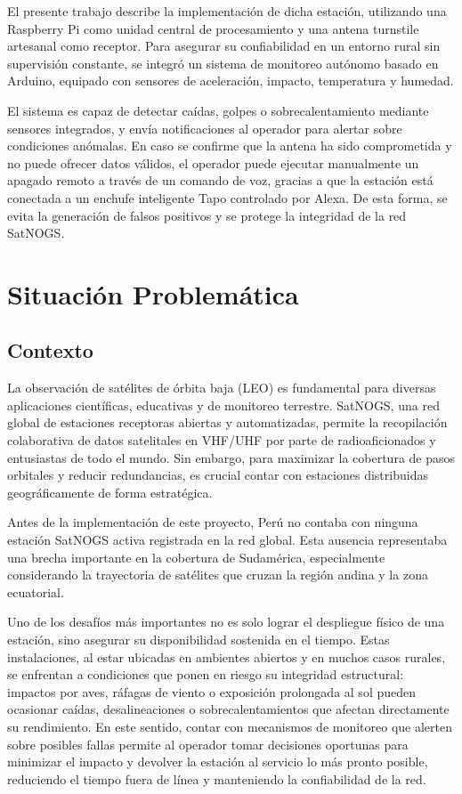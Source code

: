 \documentclass[conference]{IEEEtran}
\begin{document}
El presente trabajo describe la implementación de dicha estación, utilizando una Raspberry Pi como unidad central de procesamiento y una antena turnstile artesanal como receptor. Para asegurar su confiabilidad en un entorno rural sin supervisión constante, se integró un sistema de monitoreo autónomo basado en Arduino, equipado con sensores de aceleración, impacto, temperatura y humedad.

El sistema es capaz de detectar caídas, golpes o sobrecalentamiento mediante sensores integrados, y envía notificaciones al operador para alertar sobre condiciones anómalas. En caso se confirme que la antena ha sido comprometida y no puede ofrecer datos válidos, el operador puede ejecutar manualmente un apagado remoto a través de un comando de voz, gracias a que la estación está conectada a un enchufe inteligente Tapo controlado por Alexa. De esta forma, se evita la generación de falsos positivos y se protege la integridad de la red SatNOGS.

\section{Situación Problemática}
\subsection{Contexto}

La observación de satélites de órbita baja (LEO) es fundamental para diversas aplicaciones científicas, educativas y de monitoreo terrestre. SatNOGS, una red global de estaciones receptoras abiertas y automatizadas, permite la recopilación colaborativa de datos satelitales en VHF/UHF por parte de radioaficionados y entusiastas de todo el mundo. Sin embargo, para maximizar la cobertura de pasos orbitales y reducir redundancias, es crucial contar con estaciones distribuidas geográficamente de forma estratégica.

Antes de la implementación de este proyecto, Perú no contaba con ninguna estación SatNOGS activa registrada en la red global. Esta ausencia representaba una brecha importante en la cobertura de Sudamérica, especialmente considerando la trayectoria de satélites que cruzan la región andina y la zona ecuatorial.

Uno de los desafíos más importantes no es solo lograr el despliegue físico de una estación, sino asegurar su disponibilidad sostenida en el tiempo. Estas instalaciones, al estar ubicadas en ambientes abiertos y en muchos casos rurales, se enfrentan a condiciones que ponen en riesgo su integridad estructural: impactos por aves, ráfagas de viento o exposición prolongada al sol pueden ocasionar caídas, desalineaciones o sobrecalentamientos que afectan directamente su rendimiento. En este sentido, contar con mecanismos de monitoreo que alerten sobre posibles fallas permite al operador tomar decisiones oportunas para minimizar el impacto y devolver la estación al servicio lo más pronto posible, reduciendo el tiempo fuera de línea y manteniendo la confiabilidad de la red.
\end{document}
